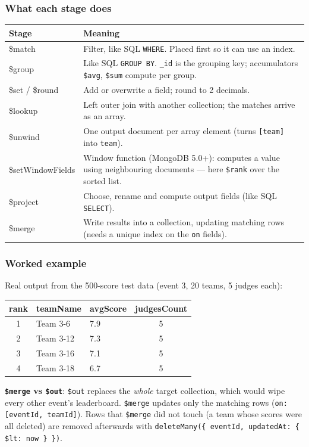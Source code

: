 \documentclass[11pt,a4paper]{article}
\newcommand{\op}[1]{\texttt{\$#1}}
\begin{document}
\subsubsection*{What each stage does}
\begin{tabularx}{\linewidth}{@{}>{\ttfamily}p{3.1cm}X@{}}
\toprule
\normalfont\textbf{Stage} & \textbf{Meaning}\\
\midrule
\$match & Filter, like SQL \texttt{WHERE}. Placed first so it can use an index. \\
\$group & Like SQL \texttt{GROUP BY}. \texttt{\_id} is the grouping key; accumulators \op{avg}, \op{sum} compute per group. \\
\$set / \$round & Add or overwrite a field; round to 2 decimals. \\
\$lookup & Left outer join with another collection; the matches arrive as an array. \\
\$unwind & One output document per array element (turns \texttt{[team]} into \texttt{team}). \\
\$setWindowFields & Window function (MongoDB 5.0+): computes a value using neighbouring documents --- here \op{rank} over the sorted list. \\
\$project & Choose, rename and compute output fields (like SQL \texttt{SELECT}). \\
\$merge & Write results into a collection, updating matching rows (needs a unique index on the \texttt{on} fields). \\
\bottomrule
\end{tabularx}

\subsubsection*{Worked example}
Real output from the 500-score test data (event 3, 20 teams, 5 judges each):
\begin{center}
\begin{tabular}{@{}cllc@{}}
\toprule
\textbf{rank} & \textbf{teamName} & \textbf{avgScore} & \textbf{judgesCount}\\
\midrule
1 & Team 3-6 & 7.9 & 5\\
2 & Team 3-12 & 7.3 & 5\\
3 & Team 3-16 & 7.1 & 5\\
4 & Team 3-18 & 6.7 & 5\\
\bottomrule
\end{tabular}
\end{center}

\begin{viva}
\textbf{\op{merge} vs \op{out}}: \op{out} replaces the \emph{whole} target collection, which would wipe every other
event's leaderboard. \op{merge} updates only the matching rows (\texttt{on: [eventId, teamId]}). Rows that
\op{merge} did not touch (a team whose scores were all deleted) are removed afterwards with
\texttt{deleteMany(\{ eventId, updatedAt: \{ \$lt: now \} \})}.
\end{viva}
\end{document}
